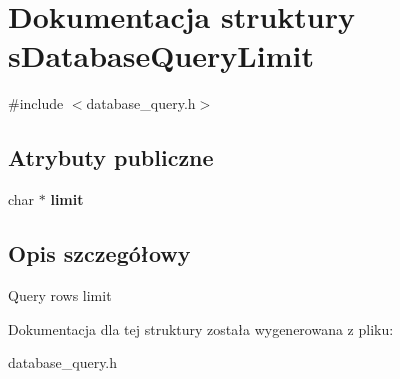 \hypertarget{structsDatabaseQueryLimit}{}\section{Dokumentacja struktury s\+Database\+Query\+Limit}
\label{structsDatabaseQueryLimit}


{\ttfamily \#include $<$database\+\_\+query.\+h$>$}

\subsection*{Atrybuty publiczne}
\begin{DoxyCompactItemize}
\item 
char $\ast$ {\bfseries limit}\hypertarget{structsDatabaseQueryLimit_a5b4d5190d79ffb220342d502d7a3a480}{}\label{structsDatabaseQueryLimit_a5b4d5190d79ffb220342d502d7a3a480}

\end{DoxyCompactItemize}


\subsection{Opis szczegółowy}
Query rows limit 

Dokumentacja dla tej struktury została wygenerowana z pliku\+:\begin{DoxyCompactItemize}
\item 
database\+\_\+query.\+h\end{DoxyCompactItemize}
